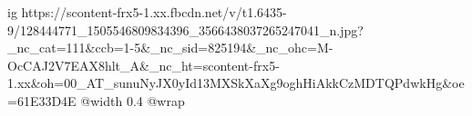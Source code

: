  
 
 
 
 

\ifcmt
  ig https://scontent-frx5-1.xx.fbcdn.net/v/t1.6435-9/128444771_1505546809834396_3566438037265247041_n.jpg?_nc_cat=111&ccb=1-5&_nc_sid=825194&_nc_ohc=M-OcCAJ2V7EAX8hlt_A&_nc_ht=scontent-frx5-1.xx&oh=00_AT_sunuNyJX0yId13MXSkXaXg9oghHiAkkCzMDTQPdwkHg&oe=61E33D4E
  @width 0.4
  @wrap 
\fi
